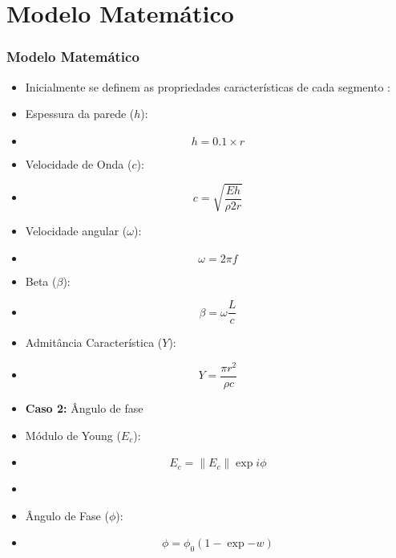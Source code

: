 \documentclass[10pt]{beamer}
\theoremstyle{remark}
\theoremstyle{definition}
\begin{document}
	\section{Modelo Matemático}
	\begin{frame}[allowframebreaks]
		\frametitle{Modelo Matemático}
		
		\begin{itemize}
			\item Inicialmente se definem as propriedades características de cada segmento :
			
			\item Espessura da parede ($h$):		
			\item 
					\begin{equation}
					h = 0.1 \times r
					\label{05}
					\end{equation}
			\item Velocidade de Onda ($c$):
			\item 
					\begin{equation}
					 c = \sqrt{\frac{Eh}{\rho 2 r}}
					\label{06}
					\end{equation}
		\end{itemize}
		
		\framebreak
		
		\begin{itemize}
			\item Velocidade angular ($\omega$):
			\item 
					\begin{equation}
					\omega = 2 \pi f
					\label{07}
					\end{equation}
			\item Beta ($\beta$):
			\item 
					\begin{equation}
					 \beta = \omega \frac{L}{c}
					\label{08}
					\end{equation}
			\item Admitância Característica ($Y$):
			\item  
					\begin{equation}
					 Y = \frac{\pi r^2}{\rho c}
					\label{09}
					\end{equation}
			
		\end{itemize}
		
		
		\framebreak
		
		\begin{itemize}
			\item \textbf{Caso 2:} Ângulo de fase
			\item Módulo de Young ($E_c$):
			\item 
					\begin{equation}
					  E_c = \|E_c\|\exp{i\phi}
					\label{12}
					\end{equation}
			\item
			\item Ângulo de Fase ($\phi$):
			\item 
					\begin{equation}
					 \phi = \phi_0 (1 - \exp{-w})
					\label{13}
					\end{equation}
			

\end{itemize}
\end{frame}
\end{document}
